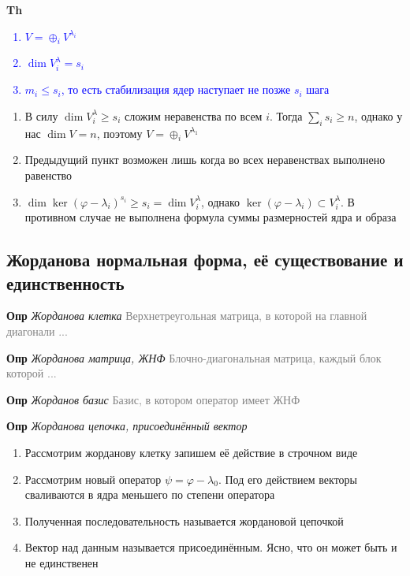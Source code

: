 \textbf{Th} \textcolor{blue}{
    \begin{enumerate}
        \item $V = \oplus_i V^{\lambda_i}$
        \item $\dim V^\lambda_i = s_i$
        \item $m_i \leq s_i$, то есть стабилизация ядер наступает не позже $s_i$ шага
    \end{enumerate}             }

\begin{enumerate}
    \item В силу $\dim V^\lambda_i \geq s_i$ сложим неравенства по всем $i$.
    Тогда $\sum_i s_i \geq n$, однако у нас $\dim V = n$, поэтому $V = \oplus_i V^{\lambda_1}$
    \item Предыдущий пункт возможен лишь когда во всех неравенствах выполнено равенство
    \item $\dim \ker (\varphi - \lambda_i)^{s_i} \geq s_i = \dim V^\lambda_i$, однако $\ker (\varphi -
    \lambda_i) \subset V^\lambda_i$.
    В противном случае не выполнена формула суммы размерностей ядра и образа
\end{enumerate}

\subsection{Жорданова нормальная форма, её существование и единственность}

\textbf{Опр} \textit{Жорданова клетка} \textcolor{gray}{Верхнетреугольная матрица, в которой на главной диагонали ...}

\textbf{Опр} \textit{Жорданова матрица, ЖНФ} \textcolor{gray}{Блочно-диагональная матрица, каждый блок которой ...}

\textbf{Опр} \textit{Жорданов базис} \textcolor{gray}{Базис, в котором оператор имеет ЖНФ}

\textbf{Опр} \textit{Жорданова цепочка, присоединённый вектор}

\begin{enumerate}
    \item Рассмотрим жорданову клетку запишем её действие в строчном виде
    \item Рассмотрим новый оператор $\psi = \varphi - \lambda_0$.
    Под его действием векторы сваливаются в ядра меньшего по степени оператора
    \item Полученная последовательность называется жордановой цепочкой
    \item Вектор над данным называется присоединённым.
    Ясно, что он может быть и не единственен
\end{enumerate}

